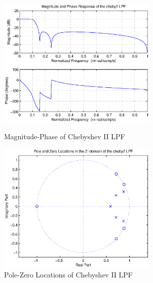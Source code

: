 \documentclass{article}
\begin{document}
\begin{figure}[ht]
\begin{minipage}[b]{0.5\linewidth}
\centering
\includegraphics[width=3in]{project6_07.eps}
\caption{Magnitude-Phase of  Chebyshev II LPF}
\label{fig:figure7}
\end{minipage}
\hspace{0.5cm}
\begin{minipage}[b]{0.5\linewidth}
\centering
\includegraphics[width=3in]{project6_08.eps}
\caption{Pole-Zero Locations of  Chebyshev II LPF}
\label{fig:figure8}
\end{minipage}
\end{figure}
\end{document}
